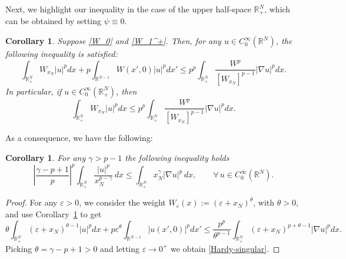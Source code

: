\documentclass[12pt]{amsart}
\newtheorem{corollary}[theorem]{Corollary}
\theoremstyle{definition}
\theoremstyle{plain}
\begin{document}
Next, we highlight our inequality in the case of the upper half-space $\mathbb{R}^{N}_+$, 
which can be obtained by setting $\psi\equiv0$.

\begin{corollary}\label{Hardy-Type I} Suppose \eqref{W_0} and \eqref{W_1^+}. Then, for 
any $u \in C_0^\infty(\mathbb{R}^N)$, the following inequality is satisfied:
		\begin{equation}\label{Hardy-Geral-Positiva}
			\int_{\mathbb{R}^N_+} W_{x_N}|u|^pdx+p	\int_{\mathbb{R}^{N-1}}  
            W(x',0)|u|^{p}dx'\leq p^p\int_{\mathbb{R}^{N}_+} 
            \frac{W^p}{[W_{x_N}]^{p-1}} |\nabla u|^pdx.
		\end{equation}
		In particular, if $u \in C_0^\infty(\mathbb{R}^N_+)$, then
		$$
		\int_{\mathbb{R}^N_+} W_{x_N}|u|^pdx\leq p^p\int_{\mathbb{R}^{N}_+} 
        \frac{W^p}{[W_{x_N}]^{p-1}} |\nabla u|^pdx.
		$$
	\end{corollary}

As a consequence, we have the following:

\begin{corollary}\label{Singular-1}
 For any $\gamma>p-1$ the following inequality holds
\begin{equation}\label{Hardy-singular}
 \left|\frac{\gamma -p+1}{p}\right|^{p}\int_{\mathbb{R}^N_+} \frac{|u|^p}{x_N^{p-\gamma}}\,dx \leq  
\int_{\mathbb{R}^N_+} x_N^{\gamma}|\nabla u|^p \, dx,\qquad \forall\, u\in C_0^\infty(\mathbb{R}^N).   \end{equation}
\end{corollary}
\begin{proof}
For any $\varepsilon>0$, we consider the weight $W_\varepsilon(x):=
(\varepsilon+x_N)^\theta$, with $\theta>0$, and use Corollary~\ref{Hardy-Type I} to get
$$
\theta\int_{\mathbb{R}^N_+}(\varepsilon+x_N)^{\theta-1}|u|^pdx+p \varepsilon^\theta
\int_{\mathbb{R}^{N-1}}|u(x',0)|^pdx'\leq\frac{p^p}{\theta^{p-1}}
\int_{\mathbb{R}^N_+}(\varepsilon+x_N)^{p+\theta-1}|\nabla u|^pdx.
$$
Picking  $\theta = \gamma-p+1>0$ and letting $\varepsilon\rightarrow0^+$ we 
obtain \eqref{Hardy-singular}. 
\end{proof}
    
\end{document}

